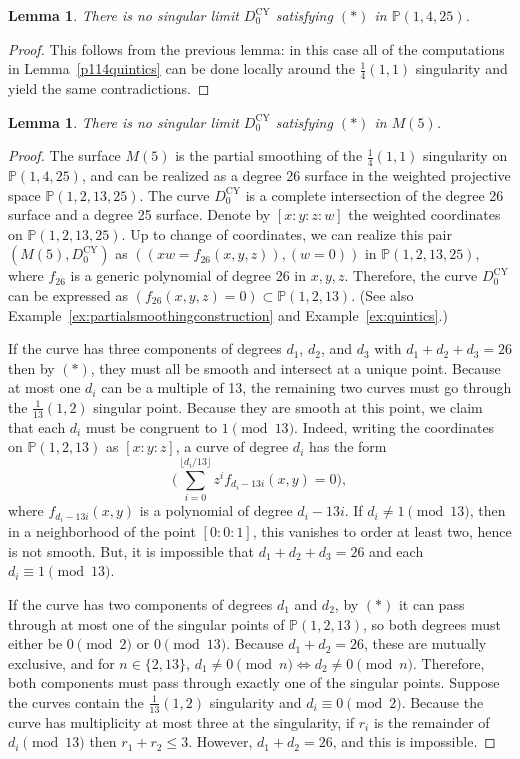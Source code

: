 \documentclass[JEP,XML,SOM,Unicode,NoFloatCountersInSection,published]{cedram}
\theoremstyle{plain}
\newtheorem{lemma}[theorem]{Lemma}
\theoremstyle{definition}
\newcommand\PP{{\mathbb{P}}}
\newcommand\Dcyo{{D^{\mathrm{CY}}_0}}
\begin{document}
\begin{lemma}\label{p1425quintics}
There is no singular limit $\Dcyo$ satisfying $(\ast)$ in $\PP(1,4,25)$.
\end{lemma}

\begin{proof}
This follows from the previous lemma: in this case all of the computations in Lemma~\ref{p114quintics} can be done locally around the $\frac{1}{4}(1,1)$ singularity and yield the same contradictions.
\end{proof}

\begin{lemma}\label{m5quintics}
There is no singular limit $\Dcyo$ satisfying $(\ast)$ in $M(5)$.
\end{lemma}

\begin{proof}
The surface $M(5)$ is the partial smoothing of the $\frac{1}{4}(1,1)$ singularity on $\PP(1,4,25)$, and can be realized as a degree 26 surface in the weighted projective space $\PP(1,2,13,25)$. The curve $\Dcyo$ is a complete intersection of the degree 26 surface and a degree 25 surface. Denote by $[x:y:z:w]$ the weighted coordinates on $\PP(1,2,13,25)$. Up to change of coordinates, we can realize this pair $(M(5), \Dcyo)$ as $((xw = f_{26}(x,y,z)), (w = 0))$ in $\PP(1,2,13,25)$, where $f_{26}$ is a generic polynomial of degree 26 in $x,y,z$. Therefore, the curve $\Dcyo$ can be expressed as $(f_{26}(x,y,z) = 0) \subset \PP(1,2,13)$. (See also Example~\ref{ex:partialsmoothingconstruction} and Example~\ref{ex:quintics}.)

If the curve has three components of degrees $d_1$, $d_2$, and $d_3$ with $d_1+d_2+d_3=26$ then by $(\ast)$, they must all be smooth and intersect at a unique point. Because at most one $d_i$ can be a multiple of 13, the remaining two curves must go through the $\frac{1}{13}(1,2)$ singular point. Because they are smooth at this point, we claim that each $d_i$ must be congruent to $1 \pmod{13}$. Indeed, writing the coordinates on $\PP(1,2,13)$ as $[x:y:z]$, a curve of degree $d_i$ has the form
\[ \biggl( \sum_{i = 0}^{\lfloor d_i/13 \rfloor} z^i f_{d_i-13i}(x,y) = 0 \biggr), \]
where $f_{d_i - 13i}(x,y)$ is a polynomial of degree $d_i - 13i$. If $d_i \ne 1 \pmod{13}$, then in a neighborhood of the point $[0:0:1]$, this vanishes to order at least two, hence is not smooth. But, it is impossible that $d_1 + d_2 + d_3 = 26$ and each $d_i \equiv 1 \pmod{13}$.

If the curve has two components of degrees $d_1$ and $d_2$, by $(\ast)$ it can pass through at most one of the singular points of $\PP(1,2,13)$, so both degrees must either be \hbox{$0 \pmod 2$} or $0 \pmod{13}$. Because $d_1 + d_2 = 26$, these are mutually exclusive, and for $n \in \{2,13\}$, $d_1 \ne 0 \pmod{n} \iff d_2 \ne 0 \pmod{n}$. Therefore, both components must pass through exactly one of the singular points. Suppose the curves contain the $\frac{1}{13}(1,2)$ singularity and $d_i \equiv 0 \pmod{2}$. Because the curve has multiplicity at most three at the singularity, if $r_i$ is the remainder of $d_i \pmod{13}$ then $r_1+r_2 \le 3$. However, $d_1 + d_2 = 26$, and this is impossible.


\end{proof}
\end{document}
